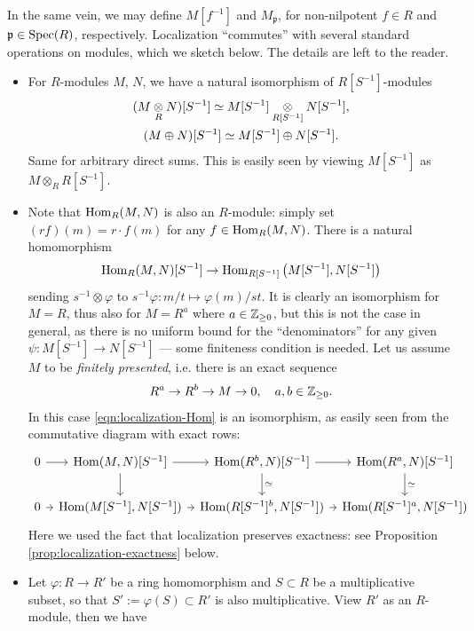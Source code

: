 In the same vein, we may define $M[f^{-1}]$ and $M_{\mathfrak{p}}$, for non-nilpotent $f \in R$ and $\mathfrak{p} \in \operatorname{Spec}(R)$, respectively. Localization ``commutes'' with several standard operations on modules, which we sketch below. The details are left to the reader.
\begin{itemize}
	\item For $R$-modules $M$, $N$, we have a natural isomorphism of $R[S^{-1}]$-modules
		\begin{gather*}
			(M \underset{R}{\otimes} N)[S^{-1}] \simeq M[S^{-1}] \underset{R[S^{-1}]}{\otimes} N[S^{-1}], \\
			(M \oplus N)[S^{-1}] \simeq M[S^{-1}] \oplus N[S^{-1}].
		\end{gather*}
		Same for arbitrary direct sums. This is easily seen by viewing $M[S^{-1}]$ as $M \otimes_R R[S^{-1}]$.
	\item Note that $\operatorname{Hom}_R(M, N)$ is also an $R$-module: simply set $(rf)(m) = r \cdot f(m)$ for any $f \in \operatorname{Hom}_R(M, N)$. There is a natural homomorphism
		\begin{gather}\label{eqn:localization-Hom}
			\operatorname{Hom}_R(M, N)[S^{-1}] \to \operatorname{Hom}_{R[S^{-1}]} \left( M[S^{-1}], N[S^{-1}] \right)
		\end{gather}
		sending $s^{-1} \otimes \varphi$ to $s^{-1}\varphi: m/t \mapsto \varphi(m)/st$. It is clearly an isomorphism for $M = R$, thus also for $M = R^a$ where $a \in \mathbb{Z}_{\geq 0}$, but this is not the case in general, as there is no uniform bound for the ``denominators'' for any given $\psi: M[S^{-1}] \to N[S^{-1}]$ --- some finiteness condition is needed. Let us assume $M$ to be \emph{finitely presented}, i.e. there is an exact sequence
		\[ R^a \to R^b \to M \to 0, \quad a,b \in \mathbb{Z}_{\geq 0}. \]
		In this case \eqref{eqn:localization-Hom} is an isomorphism, as easily seen from the commutative diagram with exact rows:
		\[ \begin{tikzcd}[column sep=tiny]
			0 \arrow[r] & \Hom(M,N)[S^{-1}] \arrow[r] \arrow[d] & \Hom(R^b, N)[S^{-1}] \arrow[r] \arrow[d, "\simeq"] & \Hom(R^a, N)[S^{-1}] \arrow[d, "\simeq"] \\
			0 \arrow[r] & \Hom(M[S^{-1}], N[S^{-1}]) \arrow[r] & \Hom(R[S^{-1}]^b, N[S^{-1}]) \arrow[r] & \Hom(R[S^{-1}]^a, N[S^{-1}])
		\end{tikzcd}\]
		Here we used the fact that localization preserves exactness: see Proposition \ref{prop:localization-exactness} below.
	\item Let $\varphi: R \to R'$ be a ring homomorphism and $S \subset R$ be a multiplicative subset, so that $S' := \varphi(S) \subset R'$ is also multiplicative. View $R'$ as an $R$-module, then we have

\end{itemize}

